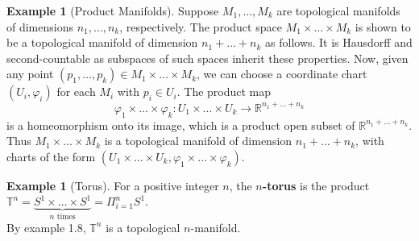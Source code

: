 \documentclass[reqno]{amsart}
\theoremstyle{plain}%
\theoremstyle{definition}
\newtheorem{example}[theorem]{Example}
\theoremstyle{remark}
\begin{document}
        \begin{example}[Product Manifolds]
            Suppose $M_1,\ldots, M_k$ are
        topological manifolds of dimensions $n_1, \ldots, n_k$, respectively. The
        product space $M_1 \times \ldots \times M_k$ is shown to be a topological
        manifold of dimension $n_1 + \ldots + n_k$ as follows. It is Hausdorff and
        second-countable as subspaces of such spaces inherit these properties. Now,
        given any point $\left( p_1, \ldots, p_k \right) \in M_1 \times \ldots \times
        M_k$, we can choose a coordinate chart $\left( U_i, \varphi_i \right) $ for
        each
        $M_i$ with $p_i \in U_i$. The product map
        \[
        \varphi_1 \times \ldots \times \varphi_k  \colon U_1 \times \ldots \times U_k
        \to \mathbb{R}^{n_1+\ldots + n_k}
        \] 
         is a homeomorphism onto its image, which is a product open subset of
         $\mathbb{R}^{n_1 + \ldots + n_k}$. Thus $M_1 \times \ldots \times M_k$ is
         a topological manifold of dimension $n_1 +\ldots + n_k$, with charts of the
         form $\left( U_1 \times  \ldots \times U_k, \varphi_1 \times \ldots \times 
         \varphi_k \right) $.
        \end{example} 

        \begin{example}[Torus]
            For a positive integer $n$, the
         \textbf{$n$-torus} is the product $\mathbb{T}^{n} = 
         \underbrace{S^{1} \times \ldots \times S^{1}}_{n\text{ times}}
         = \Pi_{i=1}^{n} S^{1}$.\\
         By example 1.8, $\mathbb{T}^{n}$ is a topological $n$-manifold.
        \end{example} 
\end{document}
